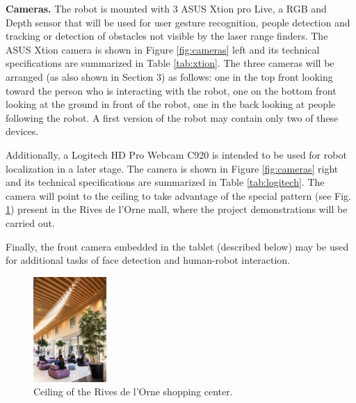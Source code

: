 {\bf Cameras.} The robot is mounted with 3 ASUS Xtion pro Live, a RGB
and Depth sensor that will be used for user gesture recognition,
people detection and tracking or detection of obstacles not visible by
the laser range finders. 
The ASUS Xtion camera is shown in Figure \ref{fig:cameras} left and its technical specifications are summarized in Table \ref{tab:xtion}.
The three cameras will be arranged (as also shown in Section 3) as follows:
one in the top front looking toward the person who is interacting with the robot,
one on the bottom front looking at the ground in front of the robot, one in the back looking at people following the robot.
A first version of the robot may contain only two of these devices.

Additionally, a Logitech HD Pro Webcam C920 is intended to be used for
robot localization in a later stage.
The camera is shown in Figure \ref{fig:cameras} right and its technical specifications are summarized in Table \ref{tab:logitech}.
The camera will point to the ceiling
to take advantage of the special pattern (see Fig. \ref{fig:ceiling}) present in
the Rives de l'Orne mall, where the project demonstrations will be
carried out.

Finally, the front camera embedded in the tablet (described below) may be used for additional tasks of face detection and human-robot interaction.

\begin{figure}[h!]
\begin{center}
\includegraphics[height=4cm]{fig/ceiling.jpg}
\end{center}
\caption{Ceiling of the Rives de l'Orne shopping center.}
\label{fig:ceiling}
\end{figure}

